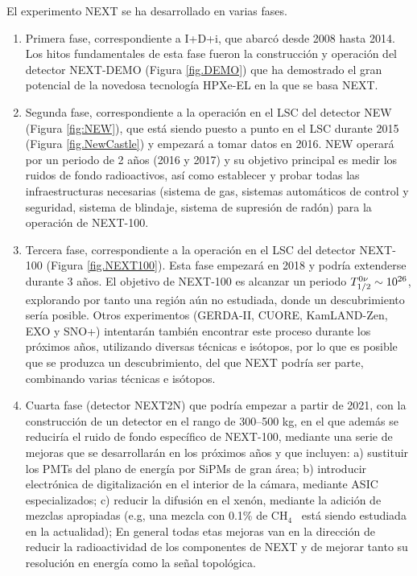 El experimento NEXT se ha desarrollado en varias fases. 
 \begin{enumerate}
\item Primera fase, correspondiente a I+D+i, que abarcó desde 2008 hasta 2014. Los hitos fundamentales de esta fase fueron la construcción y operación del detector NEXT-DEMO (Figura \ref{fig.DEMO}) que ha demostrado el gran potencial de la novedosa tecnología HPXe-EL en la que se basa NEXT. 
\item Segunda fase, correspondiente a la operación en el LSC del detector NEW (Figura \ref{fig:NEW}), que está siendo puesto a punto en el LSC durante 2015 (Figura \ref{fig.NewCastle}) y empezará a tomar datos en 2016. NEW operará por un periodo de 2 años (2016 y 2017) y su objetivo principal es medir los ruidos de fondo radioactivos, así como establecer y probar todas las infraestructuras necesarias (sistema de gas, sistemas automáticos de control y seguridad, sistema de blindaje, sistema de supresión de radón) para la operación de NEXT-100.
\item Tercera fase, correspondiente a  la operación en el LSC del detector NEXT-100  (Figura \ref{fig.NEXT100}). Esta fase empezará en 2018 y podría extenderse durante 3 años.
 El objetivo de NEXT-100 es alcanzar un periodo 
$T_{1/2}^{0\nu} \sim 10^{26}$, explorando por tanto una región aún no estudiada, donde un descubrimiento sería posible.  Otros experimentos (GERDA-II, CUORE, KamLAND-Zen, EXO y SNO+) intentarán también encontrar este proceso durante los próximos años, utilizando diversas técnicas e isótopos, por lo que es posible que se produzca un descubrimiento, del que NEXT podría ser parte, combinando varias técnicas e isótopos. 
\item Cuarta fase (detector NEXT2N) que podría empezar a partir de 2021, con la construcción de un detector en el rango de 300--500 kg, en el que además se reduciría el ruido de fondo específico de NEXT-100, mediante una serie de mejoras que se desarrollarán en los próximos años y que incluyen: a) sustituir los PMTs del plano de energía por SiPMs de gran área; b) introducir electrónica de digitalización en el interior de la cámara, mediante ASIC especializados; c) reducir la difusión en el xenón, mediante la adición de mezclas apropiadas (e.g, una mezcla con 0.1\% de CH$_4$~ está siendo estudiada en la actualidad); En general todas etas mejoras van en la dirección de reducir la radioactividad de los componentes de NEXT y de mejorar tanto su resolución en energía como la señal topológica. 
\end{enumerate}


